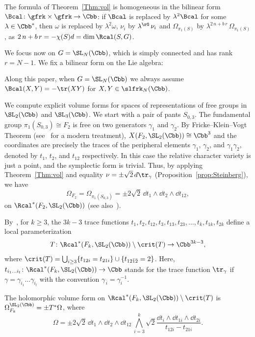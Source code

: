The formula of Theorem~\ref{Thm:vol} is homogeneous in the bilinear form $\Bcal\colon\gfrk\times\gfrk\to\Cbb $: if $\Bcal$ is replaced by $\lambda^2\Bcal$ for some $\lambda\in\Cbb^* $, then $\omega$ is replaced by $\lambda^2\omega $, $\nu_i$ by $\lambda^\rG\, \nu_i$ and $ \Omega_{\pi_1(S)}$ by $ \lambda^{2\,n+ b\, r}\, \Omega_{\pi_1(S)}$, as $ {2\,n+b\,r}=-\chi(S)d=\dim \Rcal(S,G) $.



We focus now on $G=\SL_N (\Cbb)$, which is simply connected and has rank $r=N-1$. We fix a bilinear form on the Lie algebra:

\begin{conv}
Along this paper, when $G=\SL_N (\Cbb)$ we always assume $\Bcal(X,Y)=- \tr(XY)$ for $X,Y\in \slfrk_N (\Cbb)$.
\end{conv}


We compute explicit volume forms for spaces of representations of free groups in $\SL_2(\Cbb)$ and $\SL_3(\Cbb)$. We start with a pair of pants $S_{0,3}$. The fundamental group $\pi_1(S_{0,3})\cong F_2$ is free on two generators $\gamma_1$ and $\gamma_ 2$. By Fricke--Klein--Vogt Theorem \cite{Fricke, FrickeKlein, Vogt} (see~\cite{Goldman09,Magnus} for a modern treatment), $X(F_2, \SL_2(\Cbb))\cong\Cbb^3$ and the coordinates are precisely the traces of the peripheral elements $\gamma_1$, $\gamma_2$, and $\gamma_1\gamma_2$, denoted by $t_1$, $t_2$, and $t_{12}$ respectively. In this case the relative character variety is just a point, and the symplectic form is trivial. Thus, by applying Theorem~\ref{Thm:vol} and equality $
\nu=\pm\sqrt 2 \, d \tr_\gamma $ (Proposition~\ref{prop:Steinberg}), we have
\[
\Omega_{F_ 2} =\Omega_{\pi_1(S_{0,3})}=\pm 2\sqrt 2 \, \dd t_1\wedge \dd t_2\wedge \dd t_{12},
\]
on $\Rcal^*(F_2,\SL_2(\Cbb))$ (see also~\cite[4.3.1]{Marche2016}).


By~\cite{AcunaMontesinos}, for $k\!\geq\! 3$, the $3k-3$ trace functions $t_1,t_2,t_{12}, t_3,t_{13}, t_{23}, \dots, t_{k},t_{1k},t_{2k}$ define a local parameterization
\[
T\colon \Rcal^*(F_k,\SL_2(\Cbb)) \setminus \crit(T)
\to \Cbb^{3k-3},
\]
where $\crit(T) =\bigcup_{i\geq 3}\{ t_{12i}=t_{21i} \}\cup\{t_{12\bar1\bar2}=2\}$. Here, $t_{i_1\dots i_l}\colon \Rcal^*(F_k,\SL_2(\Cbb))\to\Cbb$ stands for the trace function $ \tr_\gamma$ if $\gamma = \gamma_{i_1}\dots\gamma_{i_l}$ with the convention $\gamma_{\,\bar i}=\gamma_i^{-1}$.

\begin{theo}\label{thm:F3SL2}
The holomorphic volume form on $\Rcal^*(F_k,\SL_2(\Cbb)) \setminus \crit(T)$ is $ \Omega_{F_k}^{\SL_2(\Cbb)}= \pm T^*\Omega$, where
\[
\Omega= \pm 2\sqrt{2}\, \dd t_1\wedge \dd t_2\wedge \dd t_{12} \, \bigwedge_{i=3}^k \sqrt{2} \frac{\dd t_i \wedge \dd t_{1i}\wedge \dd t_{2i} }{t_{12i}-t_{21i}}.
\]
\end{theo}


